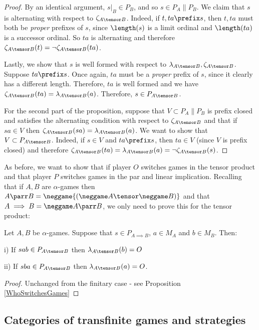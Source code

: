 \documentclass[11pt]{article} %
\begin{document}
\begin{proposition}
\begin{proof}
    By an identical argument, $s\vert_B\in P_B$, and so $s\in P_A\|P_B$.  We claim that $s$ is alternating with respect to $\zeta_{A\tensor B}$.  Indeed, if $t,ta\prefix s$, then $t,ta$ must both be \emph{proper} prefixes of $s$, since $\length(s)$ is a limit ordinal and $\length(ta)$ is a successor ordinal.  So $ta$ is alternating and therefore $\zeta_{A\tensor B}(t)=\neg\zeta_{A\tensor B}(ta)$.  

    Lastly, we show that $s$ is well formed with respect to $\lambda_{A\tensor B},\zeta_{A\tensor B}$.  Suppose $ta\prefix s$.  Once again, $ta$ must be a \emph{proper} prefix of $s$, since it clearly has a different length.  Therefore, $ta$ is well formed and we have $\zeta_{A\tensor B}(ta)=\lambda_{A\tensor B}(a)$.  Therefore, $s\in P_{A\tensor B}$.  

    For the second part of the proposition, suppose that $V\subset P_A\|P_B$ is prefix closed and satisfies the alternating condition with respect to $\zeta_{A\tensor B}$ and that if $sa\in V$ then $\zeta_{A\tensor B}(sa)=\lambda_{A\tensor B}(a)$.  We want to show that $V\subset P_{A\tensor B}$.  Indeed, if $s\in V$ and $ta\prefix s$, then $ta\in V$ (since $V$ is prefix closed) and therefore $\zeta_{A\tensor B}(ta)=\lambda_{A\tensor B}(a)=\neg\zeta_{A\tensor B}(s)$.  
  \end{proof}
\end{proposition}

As before, we want to show that if player $O$ switches games in the tensor product and that player $P$ switches games in the par and linear implication.  Recalling that if $A,B$ are $\alpha$-games then $A\parr B = \neggame{(\neggame A\tensor \neggame B)}$ and that $A\implies B = \neggame A\parr B$, we only need to prove this for the tensor product:

\begin{proposition}
  \label{TransWhoSwitchesGames}
  Let $A,B$ be $\alpha$-games.  Suppose that $s\in P_{A\implies B}$, $a\in M_A$ and $b\in M_B$.  Then:

  i) If $sab\in P_{A\tensor B}$ then $\lambda_{A\tensor B}(b) = O$

  ii) If $sba\in P_{A\tensor B}$ then $\lambda_{A\tensor B}(a) = O$.

  \begin{proof}
    Unchanged from the finitary case - see Proposition \ref{WhoSwitchesGames}
  \end{proof}
\end{proposition}

\subsection{Categories of transfinite games and strategies}
\end{document}
